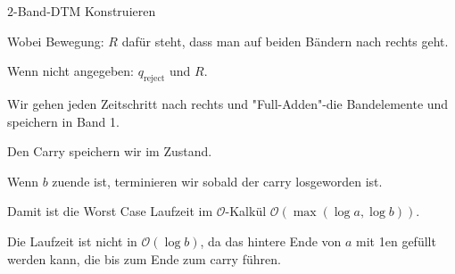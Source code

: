 \documentclass[answers]{submit}
\begin{document}
\begin{exercise}[6]{$2$-Band-DTM Konstruieren}
{  Wobei Bewegung: $R$ dafür steht, dass man auf beiden Bändern nach rechts geht.

  Wenn nicht angegeben: $q_{\text{reject}}$ und $R$.

  Wir gehen jeden Zeitschritt nach rechts und "Full-Adden"-die Bandelemente und speichern in Band 1.

  Den Carry speichern wir im Zustand.

  Wenn $b$ zuende ist, terminieren wir sobald der carry losgeworden ist.

  Damit ist die Worst Case Laufzeit im $\mathcal{O}$-Kalkül $\mathcal{O}(\max(\log a, \log b))$.

  Die Laufzeit ist nicht in $\mathcal{O}(\log b)$, da das hintere Ende von $a$ mit 1en gefüllt werden kann, die bis zum
  Ende zum carry führen.

  }
\end{exercise}
\end{document}
